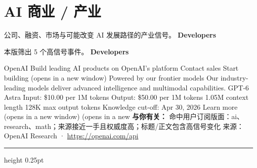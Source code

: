 \documentclass[10.5pt]{ctexart}
\begin{document}
\section*{AI 商业 / 产业}
{\color{ormuted} 公司、融资、市场与可能改变 AI 发展路径的产业信号。}
\vspace{2mm}
{\LARGE\bfseries Developers}\par
\vspace{1mm}
{\color{ormuted} 本版筛出 5 个高信号事件。}
\vspace{3mm}
{\Large\bfseries Developers}\par
OpenAI Build leading AI products on OpenAI’s platform Contact sales Start building (opens in a new window) Powered by our frontier models Our industry-leading models deliver advanced intelligence and multimodal capabilities. GPT-6 Astra Input: \$10.00 per 1M tokens Output: \$50.00 per 1M tokens 1.05M context length 128K max output tokens Knowledge cut-off: Apr 30, 2026 Learn more (opens in a new window) (opens in a new
\textbf{与你有关：} 命中用户订阅版面：ai、research、math；来源接近一手且权威度高；标题/正文包含高信号变化
{\footnotesize\color{ormuted} 来源：OpenAI Research · \url{https://openai.com/api}}
\vspace{4mm}
\hrule height 0.25pt
\vspace{3mm}
\end{document}
